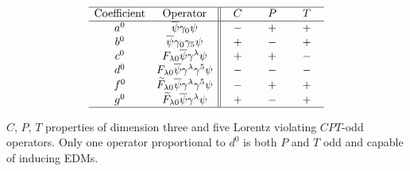 \documentclass[prl,twocolumn,tightenlines,preprintnumbers,floatfix,nofootinbib]{revtex4}
\begin{document}
\begin{table}[tb]
\label{CPT_table}
\begin{equation*}
\begin{array}{cc||ccc}
\hline
 
${\rm Coefficient}$ & ${\rm Operator}$   &  C  &  P  &  T    \\
     
\hline
a^0 &\overline{\psi}\gamma_0 \psi & - & + & +\\

b^0 &\overline{\psi}\gamma_0 \gamma_5\psi & + & -& +\\

c^0 &F_{\lambda 0} \overline{\psi} \gamma^\lambda  \psi &
	~~+~~  &  ~~+~~  &  ~~-~~    \\

d^0 &F_{\lambda 0}  \overline{\psi} \gamma^\lambda \gamma^5 \psi &
	-  &  -  &  -    \\
	
f^0 &\widetilde{F}_{\lambda 0} \overline{\psi} \gamma^\lambda 
	 \gamma^5 \psi &
	-  &  +  &  +    \\
	
g^0 &\widetilde{F}_{\lambda 0} \overline{\psi} \gamma^\lambda 
	 \psi &
	+  &  -  &  +    \\


\hline
\end{array}	
\end{equation*}
\caption{$C$, $P$, $T$ properties of dimension three and five Lorentz violating $CPT$-odd
 operators. Only one operator
proportional to $d^0$ is both $P$ and $T$ odd and capable of inducing EDMs. }
\end{table}
\end{document}
